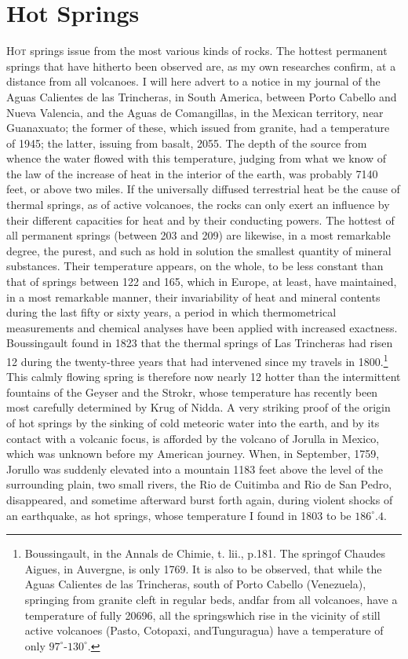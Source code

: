 \chapter{Hot Springs}


\lettrine[lines=4]{\goudy H}{ot} springs issue from the most various kinds of rocks. The hottest permanent springs that have hitherto been observed are, as my own researches confirm, at a distance from all volcanoes. I will here advert to a notice in my journal of the Aguas Calientes de las Trincheras, in South America, between Porto Cabello and Nueva Valencia, and the Aguas de Comangillas, in the Mexican territory, near Guanaxuato; the former of these, which issued from granite, had a temperature of 1945; the latter, issuing from basalt, 2055. The depth of the source from whence the water flowed with this temperature, judging from what we know of the law of the increase of heat in the interior of the earth, was probably 7140 feet, or above two miles. If the universally diffused terrestrial heat be the cause of thermal springs, as of active volcanoes, the rocks can only exert an influence by their different capacities for heat and by their conducting powers. The hottest of all permanent springs (between 203 and 209) are likewise, in a most remarkable degree, the purest, and such as hold in solution the smallest quantity of mineral substances. Their temperature appears, on the whole, to be less constant than that of springs between 122 and 165, which in Europe, at least, have maintained, in a most remarkable manner, their invariability of heat and mineral contents during the last fifty or sixty years, a period in which thermometrical measurements and chemical analyses have been applied with increased exactness. Boussingault found in 1823 that the thermal springs of Las Trincheras had risen 12 during the twenty-three years that had intervened since my travels in 1800.\footnote{Boussingault, in the Annals de Chimie, t. lii., p.181. The springof Chaudes Aigues, in Auvergne, is only 1769. It is also to be observed, that while the Aguas Calientes de las Trincheras, south of Porto Cabello (Venezuela), springing from granite cleft in regular beds, andfar from all volcanoes, have a temperature of fully 20696, all the springswhich rise in the vicinity of still active volcanoes (Pasto, Cotopaxi, andTunguragua) have a temperature of only $97^\circ$-$130^\circ$.} This calmly flowing spring is therefore now nearly 12 hotter than the intermittent fountains of the Geyser and the Strokr, whose temperature has recently been most carefully determined by Krug of Nidda. A very striking proof of the origin of hot springs by the sinking of cold meteoric water into the earth, and by its contact with a volcanic focus, is afforded by the volcano of Jorulla in Mexico, which was unknown before my American journey. When, in September, 1759, Jorullo was suddenly elevated into a mountain 1183 feet above the level of the surrounding plain, two small rivers, the Rio de Cuitimba and Rio de San Pedro, disappeared, and sometime afterward burst forth again, during violent shocks of an earthquake, as hot springs, whose temperature I found in 1803 to be $186^\circ . 4$.


